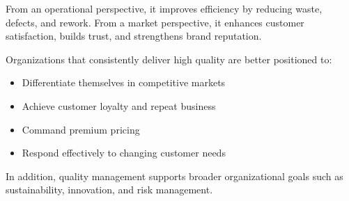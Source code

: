 \documentclass[12pt,a4paper]{article}
\begin{document}
From an operational perspective, it improves efficiency by reducing waste, defects, and rework. From a market perspective, it enhances customer satisfaction, builds trust, and strengthens brand reputation.

Organizations that consistently deliver high quality are better positioned to:
\begin{itemize}
    \item Differentiate themselves in competitive markets
    \item Achieve customer loyalty and repeat business
    \item Command premium pricing
    \item Respond effectively to changing customer needs
\end{itemize}

In addition, quality management supports broader organizational goals such as sustainability, innovation, and risk management.
\end{document}
